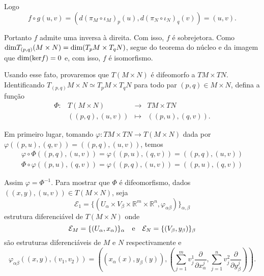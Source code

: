 \documentclass[twoside,openright,titlepage,numbers=noenddot,headinclude,  lineheaders footinclude=true,cleardoublepage=empty,BCOR=5mm,paper=a4,fontsize=12pt ]{scrbook}
\newcommand{\R}{\mathbb R}
\begin{document}
Logo
\begin{equation*}
    f \circ g(u,v) = \left(d(\pi_M \circ \iota_M)_p(u), d(\pi_N \circ \iota_N)_q(v)\right) = (u,v).
\end{equation*}

Portanto $f$ admite uma inversa à direita. Com isso, $f$ é sobrejetora. Como $\hbox{dim}T_{(p,q)} (M \times N) = \hbox{dim}(T_pM \times T_q N)$, segue do teorema do núcleo e da imagem que $\hbox{dim}(\hbox{ker}f) = 0$ e, com isso, $f$ é isomorfismo. 

Usando esse fato, provaremos que $T (M \times N)$ é difeomorfo a $TM \times TN$. Identificando $T_{(p,q)} M \times N \simeq T_p M \times T_q N$ para todo par $(p,q) \in M \times N$, defina a função 
\begin{equation*}
    \begin{array}{cccc}
        \Phi:& T (M \times N) &\longrightarrow & TM \times TN\\
            &((p,q),(u,v)) & \mapsto & ((p,u),(q,v)).
    \end{array}
\end{equation*}

 Em primeiro lugar, tomando $\varphi: TM \times TN \longrightarrow T (M\times N)$ dada por $\varphi((p,u),(q,v)) = ((p,q),(u,v))$, temos 
 \begin{eqnarray*}
     \varphi \circ \Phi((p,q),(u,v)) = \varphi((p,u),(q,v)) = ((p,q),(u,v))\\
     \Phi \circ \varphi((p,u),(q,v)) = \varphi((p,q),(u,v)) = ((p,u),(q,v))
 \end{eqnarray*}
 
Assim $\varphi = \Phi^{-1}$. Para mostrar que $\Phi$ é difeomorfismo, dados $((x,y),(u,v)) \in T(M \times N)$, seja 
\begin{equation*}
     \mathcal{E}_1 = \{(U_{\alpha} \times V_{\beta} \times \R^m \times \R^n, \varphi_{\alpha \beta})\}_{\alpha, \beta}
\end{equation*}
estrutura diferenciável de $T (M \times N)$ onde 
\begin{equation*}
    \mathcal{E}_M = \{(U_{\alpha},x_{\alpha})\}_{\alpha} \ \ \hbox{ e } \ \  \mathcal{E}_N = \{(V_{\beta},y_{\beta})\}_{\beta}
\end{equation*}
são estruturas diferenciáveis de $M$ e $N$ respectivamente e 
\begin{equation*}
    \varphi_{\alpha \beta}((x,y),(v_1,v_2)) = \left((x_{\alpha}(x),y_{\beta}(y)), \left(\sum_{j=1}^m v_j^1 \frac{\partial}{\partial x_{\alpha}^j},\sum_{j=1}^n v_j^2 \frac{\partial}{\partial y_{\beta}^j}\right)\right) .
\end{equation*}
\end{document}
